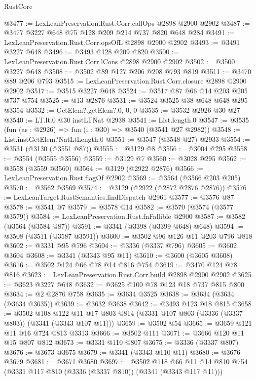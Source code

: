 \begin{lexlean}{RustCore}
\begin{coremodule}
@3477 := LexLeanPreservation.Rust.Corr.callOps @2898 @2900 @2902
@3487 := @3477 @3227 @648 @75 @128 @209 @214 @737 @820 @648 @284
@3491 := LexLeanPreservation.Rust.Corr.opsOfL @2898 @2900 @2902
@3493 := @3491 @3227 @648
@3496 := @3493 @128 @209 @820
@3500 := LexLeanPreservation.Rust.Corr.lCons @2898 @2900 @2902
@3502 := @3500 @3227 @648
@3508 := @3502 @89 @127 @206 @208 @793 @819
@3511 := @3470 @89 @206 @793
@3515 := LexLeanPreservation.Rust.Corr.closure @2898 @2900 @2902
@3517 := @3515 @3227 @648
@3524 := @3517 @87 @66 @14 @203 @205 @737 @754
@3525 := @13 @2876
@3531 := @3524 @3525 @38 @648 @648 @295 @3354
@3532 := GetElem?.getElem?.{0, 0, 0}
@3535 := @3532 @2926 @30 @27
@3540 := LT.lt.{0} @30 instLTNat @2938
@3541 := List.length.{0}
@3547 := @3535 (fun (as : @2926) => fun (i : @30) => @3540 (@3541 @27 @2982))
@3548 := List.instGetElem?NatLtLength.{0}
@3551 := @3547 (@3548 @27) @2933
@3554 := @3531 (@3130 (@3551 @87))
@3555 := @3129 @8
@3556 := @3004 @295
@3558 := @3554 (@3555 @3556)
@3559 := @3129 @7
@3560 := @3028 @295
@3562 := @3558 (@3559 @3560)
@3564 := @3129 (@2922 @2876)
@3566 := LexLeanPreservation.Rust.flagOf @2902
@3569 := @3564 (@3566 @203 @205)
@3570 := @3562 @3569
@3574 := @3129 (@2922 (@2872 @2876 @2876))
@3576 := LexLeanTarget.RustSemantics.findDispatch @2961
@3577 := @3576 @87
@3578 := @3541 @7
@3579 := @3578 @14
@3582 := @3570 (@3574 (@3577 @3579))
@3584 := LexLeanPreservation.Rust.fnFallible @2900
@3587 := @3582 (@3564 (@3584 @87))
@3591 := @3341 (@3398 (@3399 @648) @648)
@3594 := @3508 (@3511 (@3587 @3591))
@3600 := @3502 @96 @126 @11 @203 @796 @818
@3602 := @3331 @95 @796
@3604 := @3336 (@3337 @796)
@3605 := @3602 @3604
@3608 := @3341 (@3343 @95 @11)
@3610 := @3600 (@3605 @3608)
@3616 := @3502 @124 @66 @78 @14 @816 @754
@3619 := @3470 @124 @78 @816
@3623 := LexLeanPreservation.Rust.Corr.build @2898 @2900 @2902
@3625 := @3623 @3227 @648
@3632 := @3625 @100 @78 @123 @18 @737 @815 @800
@3634 := @2 @2876 @758
@3635 := @3634 @3525
@3638 := @3634 (@3634 (@3634 @3635))
@3639 := @3632 @3638
@3642 := @3493 @123 @18 @815
@3658 := @3502
    @108
    @122
    @11
    @17
    @803
    @814
    (@3331 @107 @803 (@3336 (@3337 @803)) (@3341 (@3343 @107 @11)))
@3659 := @3502 @54
@3665 := @3659 @121 @11 @16 @724 @813 @3313
@3666 := @3502 @111
@3671 := @3666 @120 @11 @15 @807 @812
@3673 := @3331 @110 @807
@3675 := @3336 (@3337 @807)
@3676 := @3673 @3675
@3679 := @3341 (@3343 @110 @11)
@3680 := @3676 @3679
@3681 := @3671 @3680
@3697 := @3502
    @118
    @66
    @11
    @14
    @810
    @754
    (@3331 @117 @810 (@3336 (@3337 @810)) (@3341 (@3343 @117 @11)))

\end{coremodule}
\end{lexlean}
